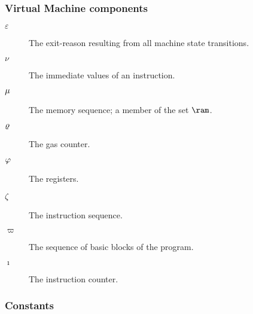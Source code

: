 \subsubsection{Virtual Machine components}

\begin{description}
  \item[$\varepsilon$] The exit-reason resulting from all machine state transitions. %
  \item[$\nu$] The immediate values of an instruction. %
  \item[$\mu$] The memory sequence; a member of the set $\ram$. %
  \item[$\varrho$] The gas counter. %
  \item[$\varphi$] The registers. %
  \item[$\zeta$] The instruction sequence. %
  \item[$\varpi$] The sequence of basic blocks of the program. %
  \item[$\imath$] The instruction counter. %
\end{description}

\subsubsection{Constants}

